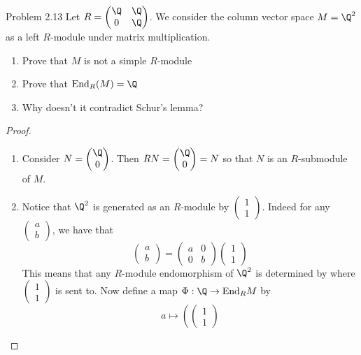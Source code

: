 \documentclass[a4paper]{article}
\begin{document}
\begin{ex}{Problem 2.13}{} Let $R=\begin{pmatrix}
\Q & \Q\\
0 & \Q
\end{pmatrix}$. We consider the column vector space $M=\Q^2$ as a left $R$-module
under matrix multiplication. 
\begin{enumerate}
\item Prove that $M$ is not a simple $R$-module
\item Prove that $\text{End}_R(M)=\Q$
\item Why doesn't it contradict Schur's lemma?
\end{enumerate} \tcbline
\begin{proof}~\\
\begin{enumerate}
\item Consider $N=\begin{pmatrix}
\Q\\0
\end{pmatrix}$. Then $RN=\begin{pmatrix}
\Q\\0
\end{pmatrix}=N$ so that $N$ is an $R$-submodule of $M$. 
\item Notice that $\Q^2$ is generated as an $R$-module by $\begin{pmatrix}
1\\1
\end{pmatrix}$. Indeed for any $\begin{pmatrix}
a\\b
\end{pmatrix}$, we have that $$\begin{pmatrix}
a\\b
\end{pmatrix}=\begin{pmatrix}
a & 0\\
0 & b
\end{pmatrix}\begin{pmatrix}
1\\1
\end{pmatrix}$$ This means that any $R$-module endomorphism of $\Q^2$ is determined by where $\begin{pmatrix}
1\\1
\end{pmatrix}$
is sent to. Now define a map $\Phi:\Q\to\text{End}_RM$ by $$a\mapsto\left(\begin{pmatrix}
1\\1

\end{pmatrix}$$
\end{enumerate}
\end{proof}
\end{ex}
\end{document}
